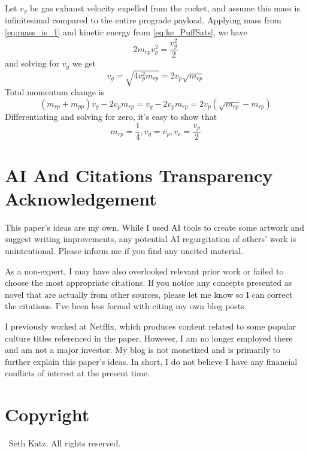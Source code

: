 \documentclass{article}
\begin{document}
Let $v_g$ be gas exhaust velocity expelled from the rocket, and assume this mass is infinitesimal compared to the entire prograde payload.  Applying mass from \autoref{eq:mass_is_1}
 and kinetic energy from \autoref{eq:ke_PuffSats}, we have 
 \begin{equation}
 2m_{rp}v_p^2= \frac{v_g^2}{2}
 \end{equation}
 and solving for $v_g$ we get 
 \begin{equation}
 v_g = \sqrt{4v_p^2m_{rp}} = 2v_p\sqrt{m_{rp}} \label{eq:vg_result}
 \end{equation}
 Total momentum change is 
 \[(m_{rp} + m_{pp})v_g - 2v_pm_{rp} = v_g-2v_pm_{rp} = 2v_p(\sqrt{m_{rp}} - m_{rp}) \]
Differentiating and solving for zero, it's easy to show that 
 \begin{equation}
 m_{rp} = \frac{1}{4}, \label{eq:max_m_rp}
 v_g = v_p,
 v_e= \frac{v_p}{2}
 \end{equation}

 \section{AI And Citations Transparency Acknowledgement}
 This paper's ideas are my own. While I used AI tools to create some artwork and suggest writing improvements, any potential AI regurgitation of others' work is unintentional. Please inform me if you find any uncited material.

As a non-expert, I may have also overlooked relevant prior work or failed to choose the most appropriate citations. If you notice any concepts presented as novel that are actually from other sources, please let me know so I can correct the citations. I've been less formal with citing my own blog posts.

I previously worked at Netflix, which produces content related to some popular culture titles referenced in the paper.   However, I am no longer employed there and am not a major investor. My blog is not monetized and is primarily to further explain this paper's ideas.   In short, I do not believe I have any financial conflicts of interest at the present time.

\section{Copyright}
\small
\textcopyright\ Seth Katz. All rights reserved.

 
\printbibliography 
\end{document}
